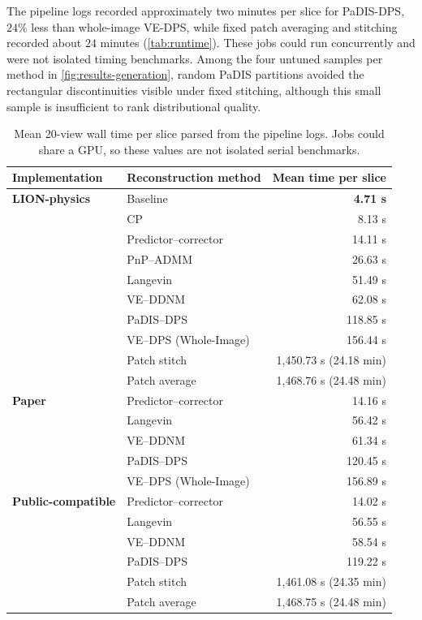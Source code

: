 The pipeline logs recorded approximately two minutes per slice for PaDIS-DPS, $24\%$ less than whole-image VE-DPS, while fixed patch averaging and stitching recorded about $24$ minutes (\autoref{tab:runtime}). These jobs could run concurrently and were not isolated timing benchmarks. Among the four untuned samples per method in \autoref{fig:results-generation}, random PaDIS partitions avoided the rectangular discontinuities visible under fixed stitching, although this small sample is insufficient to rank distributional quality.

\begin{table}[htbp]
\centering
\caption[Logged reconstruction time per slice.]{Mean 20-view wall time per slice parsed from the pipeline logs. Jobs could share a GPU, so these values are not isolated serial benchmarks.}\label{tab:runtime}
\small
\begin{tabular}{llr}
\toprule[1.1pt]
\multicolumn{1}{l}{\bfseries Implementation} & \multicolumn{1}{l}{\bfseries Reconstruction method} & \multicolumn{1}{r}{\bfseries Mean time per slice} \\
\midrule
\textbf{LION-physics} & Baseline & \textbf{4.71 s} \\
 & CP & 8.13 s \\
 & Predictor--corrector & 14.11 s \\
 & PnP--ADMM & 26.63 s \\
 & Langevin & 51.49 s \\
 & VE--DDNM & 62.08 s \\
 & PaDIS--DPS & 118.85 s \\
 & VE--DPS (Whole-Image) & 156.44 s \\
 & Patch stitch & 1,450.73 s (24.18 min) \\
 & Patch average & 1,468.76 s (24.48 min) \\
\midrule
\textbf{Paper} & Predictor--corrector & 14.16 s \\
 & Langevin & 56.42 s \\
 & VE--DDNM & 61.34 s \\
 & PaDIS--DPS & 120.45 s \\
 & VE--DPS (Whole-Image) & 156.89 s \\
\midrule
\textbf{Public-compatible} & Predictor--corrector & 14.02 s \\
 & Langevin & 56.55 s \\
 & VE--DDNM & 58.54 s \\
 & PaDIS--DPS & 119.22 s \\
 & Patch stitch & 1,461.08 s (24.35 min) \\
 & Patch average & 1,468.75 s (24.48 min) \\
\bottomrule[1.1pt]
\end{tabular}
\end{table}

